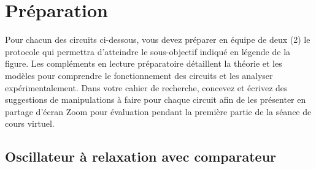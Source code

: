 \documentclass[canadien,12pt,oneside,letterpaper]{article}
\begin{document}

\section{Préparation}
\setlength{\parskip}{1ex plus 0.5ex minus 0.2ex}
Pour chacun des circuits ci-dessous, vous devez préparer en équipe de deux (2) le protocole qui permettra d'atteindre le sous-objectif indiqué en légende de la figure. Les compléments en lecture préparatoire détaillent la théorie et les modèles pour comprendre le fonctionnement des circuits et les analyser expérimentalement. Dans votre cahier de recherche, concevez et écrivez des suggestions de manipulations à faire pour chaque circuit afin de les présenter en partage d'écran Zoom pour évaluation pendant la première partie de la séance de cours virtuel.

\setlength{\parskip}{1ex plus 0.5ex minus 0.2ex}

\subsection{Oscillateur à relaxation avec comparateur}
\end{document}

